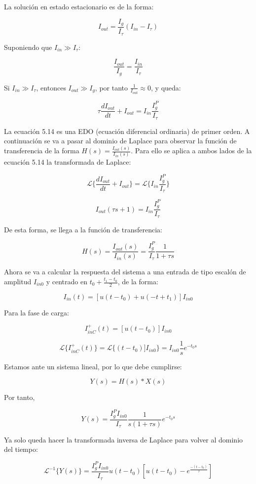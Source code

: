 La solución en estado estacionario es de la forma:

$$I_{out}=\frac{I_g}{I_{\tau}}(I_{in}-I_{\tau})$$

Suponiendo que $I_{in}\gg I_{\tau}$:

$$\frac{I_{out}}{I_g}=\frac{I_{in}}{I_{\tau}}$$

Si $I_{in}\gg I_{\tau}$, entonces $I_{out}\gg I_g$, por tanto $\frac{1}{I_{out}}\approx 0$, y queda:

\begin{equation}
\tau \frac{dI_{out}}{dt}+I_{out}=I_{in}\frac{I_g^P}{I_{\tau}}
\end{equation}

La ecuación 5.14 es una EDO (ecuación diferencial ordinaria) de primer orden. A continuación se va a pasar al dominio de Laplace para observar la función de transferencia de la forma $H(s)=\frac{I_{out}(s)}{I_{in}(s)}$. Para ello se aplica a ambos lados de la ecuación 5.14 la transformada de Laplace:

$$\mathcal{L}\{\frac{dI_{out}}{dt}+I_{out}\}=\mathcal{L}\{I_{in}\frac{I_g^P}{I_\tau}\}$$

$$I_{out}(\tau s+1)=I_{in}\frac{I_g^P}{I_\tau}$$

De esta forma, se llega a la función de transferencia:

\begin{equation}
H(s)=\frac{I_{out}(s)}{I_{in}(s)}=\frac{I_g^P}{I_{\tau}}\frac{1}{1+\tau s}
\end{equation}

Ahora se va a calcular la respuesta del sistema a una entrada de tipo escalón de amplitud $I_{in0}$ y centrado en $t_0+\frac{t_1-t_0}{2}$, de la forma:

$$I_{in}(t)=[u(t-t_0)+u(-t+t_1)]I_{in0}$$

Para la fase de carga:

$$I_{inC}^+(t)=[u(t-t_0)]I_{in0}$$

$$\mathcal{L}\{I_{inC}^+(t)\}=\mathcal{L}\{(t-t_0)]I_{in0}\}=I_{in0}\frac{1}{s}e^{-t_0s}$$

Estamos ante un sistema lineal, por lo que debe cumplirse:

$$Y(s)=H(s)*X(s)$$

Por tanto,

$$Y(s)=\frac{I_g^PI_{in0}}{I_\tau}\frac{1}{s(1+\tau s)}e^{-t_0s}$$

Ya solo queda hacer la transformada inversa de Laplace para volver al dominio del tiempo:

\begin{equation}
\mathcal{L}^{-1}\{Y(s)\}=\frac{I_g^PI_{in0}}{I_{\tau}}u(t-t_0)[u(t-t_0)-e^{\frac{-(t-t_0)}{\tau}}]
\end{equation}

